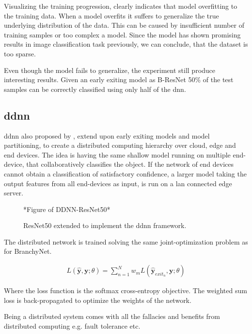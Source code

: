 Visualizing the training progression, clearly indicates that model overfitting to the training data. When a model overfits it suffers to generalize the true underlying distribution of the data. This can be caused by insufficient number of training samples or too complex a model. Since the model has shown promising results in image classification task previously, we can conclude, that the dataset is too sparse.

Even though the model fails to generalize, the experiment still produce interesting results. Given an early exiting model as B-ResNet 50\% of the test samples can be correctly classified using only half of the \gls{dnn}.

\subsection{\acrlong{ddnn}}

\gls{ddnn} \cite{teerapittayanon_distributed_2017} also proposed by \citeauthor{teerapittayanon_distributed_2017}, extend upon early exiting models and model partitioning,  to  create a distributed computing hierarchy over cloud, edge and end devices. The idea is having the same shallow model running on multiple end-device, that collaboratively classifies the object. If the network of end devices cannot obtain a classification of satisfactory confidence, a larger model taking the output features from all end-devices as input, is run on a \gls{lan} connected edge server. 

\begin{figure}
	*Figure of DDNN-ResNet50*
	\caption[\gls{ddnn}-ResNet architecture]{ResNet50 extended to implement the \gls{ddnn} framework.}
	\label{ddnn-resnet}
\end{figure}

The distributed network is trained solving the same joint-optimization problem as for BranchyNet.

\begin{align*}
L(\hat{\mathbf{y}},\mathbf{y};\theta) = \sum_{n=1}^{N} w_m L(\hat{\mathbf{y}}_{exit_n},\mathbf{y};\theta)
\end{align*}

Where the loss function is the softmax cross-entropy objective.
The weighted sum loss is back-propagated to optimize the weights of the network. 

Being a distributed system comes with all the fallacies and benefits from distributed computing e.g. fault tolerance etc.

